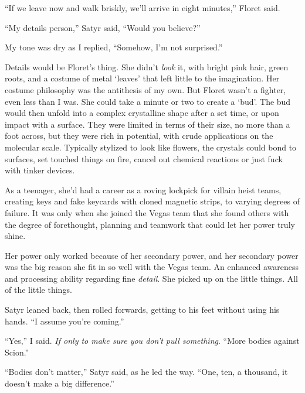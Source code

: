 ``If we leave now and walk briskly, we'll arrive in eight minutes,'' Floret said.



``My details person,'' Satyr said, ``Would you believe?''



My tone was dry as I replied, ``Somehow, I'm not surprised.''



Details would be Floret's thing.  She didn't \emph{look} it, with bright pink hair, green roots, and a costume of metal `leaves' that left little to the imagination.  Her costume philosophy was the antithesis of my own.  But Floret wasn't a fighter, even less than I was.  She could take a minute or two to create a `bud'.  The bud would then unfold into a complex crystalline shape after a set time, or upon impact with a surface.  They were limited in terms of their size, no more than a foot across, but they were rich in potential, with crude applications on the molecular scale.  Typically stylized to look like flowers, the crystals could bond to surfaces, set touched things on fire, cancel out chemical reactions or just fuck with tinker devices.



As a teenager, she'd had a career as a roving lockpick for villain heist teams, creating keys and fake keycards with cloned magnetic strips, to varying degrees of failure.  It was only when she joined the Vegas team that she found others with the degree of forethought, planning and teamwork that could let her power truly shine.



Her power only worked because of her secondary power, and her secondary power was the big reason she fit in so well with the Vegas team.  An enhanced awareness and processing ability regarding fine \emph{detail}.  She picked up on the little things.  All of the little things.



Satyr leaned back, then rolled forwards, getting to his feet without using his hands.  ``I assume you're coming.''



``Yes,'' I said.  \emph{If only to make sure you don't pull something}.  ``More bodies against Scion.''



``Bodies don't matter,'' Satyr said, as he led the way.  ``One, ten, a thousand, it doesn't make a big difference.''



